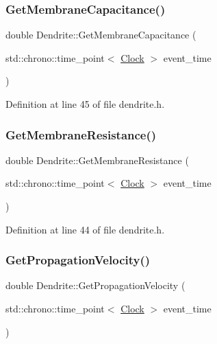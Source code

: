 \subsubsection{\texorpdfstring{Get\+Membrane\+Capacitance()}{GetMembraneCapacitance()}}
{\footnotesize\ttfamily double Dendrite\+::\+Get\+Membrane\+Capacitance (\begin{DoxyParamCaption}\item[{std\+::chrono\+::time\+\_\+point$<$ \mbox{\hyperlink{universe_8h_a0ef8d951d1ca5ab3cfaf7ab4c7a6fd80}{Clock}} $>$}]{event\+\_\+time }\end{DoxyParamCaption})\hspace{0.3cm}{\ttfamily [inline]}}



Definition at line 45 of file dendrite.\+h.

\mbox{\label{class_dendrite_ab70008318cada82e0f21f8f010858eaa}} 
\subsubsection{\texorpdfstring{Get\+Membrane\+Resistance()}{GetMembraneResistance()}}
{\footnotesize\ttfamily double Dendrite\+::\+Get\+Membrane\+Resistance (\begin{DoxyParamCaption}\item[{std\+::chrono\+::time\+\_\+point$<$ \mbox{\hyperlink{universe_8h_a0ef8d951d1ca5ab3cfaf7ab4c7a6fd80}{Clock}} $>$}]{event\+\_\+time }\end{DoxyParamCaption})\hspace{0.3cm}{\ttfamily [inline]}}



Definition at line 44 of file dendrite.\+h.

\mbox{\label{class_dendrite_af0315957a349532d25691385b6486e95}} 
\subsubsection{\texorpdfstring{Get\+Propagation\+Velocity()}{GetPropagationVelocity()}}
{\footnotesize\ttfamily double Dendrite\+::\+Get\+Propagation\+Velocity (\begin{DoxyParamCaption}\item[{std\+::chrono\+::time\+\_\+point$<$ \mbox{\hyperlink{universe_8h_a0ef8d951d1ca5ab3cfaf7ab4c7a6fd80}{Clock}} $>$}]{event\+\_\+time }\end{DoxyParamCaption})\hspace{0.3cm}{\ttfamily [inline]}}



